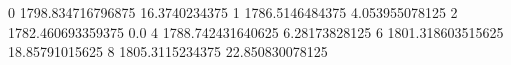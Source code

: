 0 1798.834716796875 16.3740234375
1 1786.5146484375 4.053955078125
2 1782.460693359375 0.0
4 1788.742431640625 6.28173828125
6 1801.318603515625 18.85791015625
8 1805.3115234375 22.850830078125

